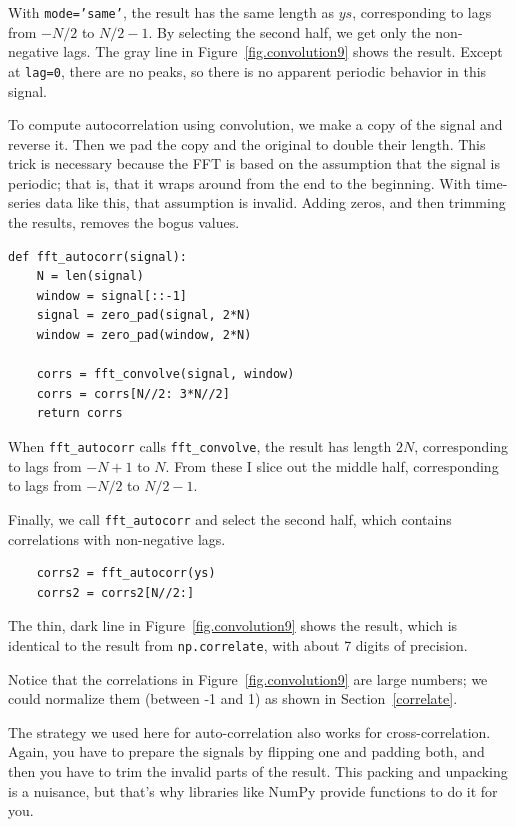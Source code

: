 \documentclass[12pt]{book}
\begin{document}
With {\tt mode='same'}, the result has the same length as $ys$,
corresponding to lags from $-N/2$ to $N/2-1$.  By selecting the
second half, we get only the non-negative lags.
The gray line in Figure~\ref{fig.convolution9} shows the result.
Except at {\tt lag=0}, there are no peaks, so there is no apparent
periodic behavior in this signal.

To compute autocorrelation using convolution, we make a copy of
the signal and reverse it.  Then we pad the copy and the original to
double their length.  This trick is necessary because the FFT is based
on the assumption that the signal is periodic; that is, that it wraps
around from the end to the beginning.  With time-series data like
this, that assumption is invalid.  Adding zeros, and then trimming 
the results, removes the bogus values.

\begin{verbatim}
def fft_autocorr(signal):
    N = len(signal)
    window = signal[::-1]
    signal = zero_pad(signal, 2*N)
    window = zero_pad(window, 2*N)

    corrs = fft_convolve(signal, window)
    corrs = corrs[N//2: 3*N//2]
    return corrs
\end{verbatim}

When \verb"fft_autocorr" calls \verb"fft_convolve", the result has
length $2N$, corresponding to lags from $-N+1$ to $N$.  From these I
slice out the middle half, corresponding to lags from $-N/2$ to
$N/2-1$.

Finally, we call \verb"fft_autocorr" and select the second half,
which contains correlations with non-negative lags.

\begin{verbatim}
    corrs2 = fft_autocorr(ys)
    corrs2 = corrs2[N//2:]
\end{verbatim}

The thin, dark line in Figure~\ref{fig.convolution9} shows the result,
which is identical to the result from {\tt np.correlate}, with
about 7 digits of precision.

Notice that the correlations in Figure~\ref{fig.convolution9} are
large numbers; we could normalize them (between -1 and 1) as shown
in Section~\ref{correlate}.

The strategy we used here for auto-correlation also works for
cross-correlation.  Again, you have to prepare the signals by flipping
one and padding both, and then you have to trim the invalid parts of
the result.  This packing and unpacking is a nuisance, but that's why
libraries like NumPy provide functions to do it for you.
\end{document}
